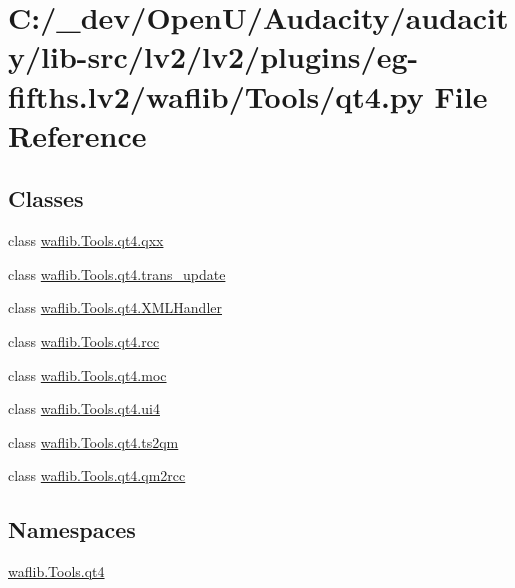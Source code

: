 \hypertarget{lv2_2plugins_2eg-fifths_8lv2_2waflib_2_tools_2qt4_8py}{}\section{C\+:/\+\_\+dev/\+Open\+U/\+Audacity/audacity/lib-\/src/lv2/lv2/plugins/eg-\/fifths.lv2/waflib/\+Tools/qt4.py File Reference}
\label{lv2_2plugins_2eg-fifths_8lv2_2waflib_2_tools_2qt4_8py}
\subsection*{Classes}
\begin{DoxyCompactItemize}
\item 
class \hyperlink{classwaflib_1_1_tools_1_1qt4_1_1qxx}{waflib.\+Tools.\+qt4.\+qxx}
\item 
class \hyperlink{classwaflib_1_1_tools_1_1qt4_1_1trans__update}{waflib.\+Tools.\+qt4.\+trans\+\_\+update}
\item 
class \hyperlink{classwaflib_1_1_tools_1_1qt4_1_1_x_m_l_handler}{waflib.\+Tools.\+qt4.\+X\+M\+L\+Handler}
\item 
class \hyperlink{classwaflib_1_1_tools_1_1qt4_1_1rcc}{waflib.\+Tools.\+qt4.\+rcc}
\item 
class \hyperlink{classwaflib_1_1_tools_1_1qt4_1_1moc}{waflib.\+Tools.\+qt4.\+moc}
\item 
class \hyperlink{classwaflib_1_1_tools_1_1qt4_1_1ui4}{waflib.\+Tools.\+qt4.\+ui4}
\item 
class \hyperlink{classwaflib_1_1_tools_1_1qt4_1_1ts2qm}{waflib.\+Tools.\+qt4.\+ts2qm}
\item 
class \hyperlink{classwaflib_1_1_tools_1_1qt4_1_1qm2rcc}{waflib.\+Tools.\+qt4.\+qm2rcc}
\end{DoxyCompactItemize}
\subsection*{Namespaces}
\begin{DoxyCompactItemize}
\item 
 \hyperlink{namespacewaflib_1_1_tools_1_1qt4}{waflib.\+Tools.\+qt4}
\end{DoxyCompactItemize}
